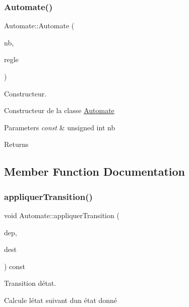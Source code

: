 \subsubsection{\texorpdfstring{Automate()}{Automate()}}
{\footnotesize\ttfamily Automate\+::\+Automate (\begin{DoxyParamCaption}\item[{const unsigned int}]{nb,  }\item[{unsigned int $\ast$$\ast$}]{regle }\end{DoxyParamCaption})}



Constructeur. 

Constructeur de la classe \mbox{\hyperlink{class_automate}{Automate}}


\begin{DoxyParams}{Parameters}
{\em const} & unsigned int nb \\
\hline
\end{DoxyParams}
\begin{DoxyReturn}{Returns}

\end{DoxyReturn}


\subsection{Member Function Documentation}
\mbox{\label{class_automate_a7d42c21ad3146b499746fef5dc74d973}} 
\subsubsection{\texorpdfstring{appliquer\+Transition()}{appliquerTransition()}}
{\footnotesize\ttfamily void Automate\+::appliquer\+Transition (\begin{DoxyParamCaption}\item[{const \mbox{\hyperlink{class_etat}{Etat}} \&}]{dep,  }\item[{\mbox{\hyperlink{class_etat}{Etat}} \&}]{dest }\end{DoxyParamCaption}) const}



Transition d\textquotesingle{}état. 

Calcule l\textquotesingle{}état suivant d\textquotesingle{}un état donné


